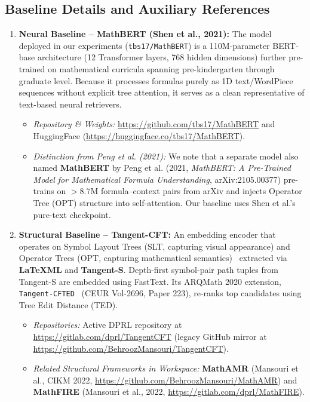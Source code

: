 \documentclass[11pt,a4paper]{article}
\begin{document}
	\subsection{Baseline Details and Auxiliary References}
	\begin{enumerate}
		\item \textbf{Neural Baseline -- MathBERT (Shen et al., 2021):} The model deployed in our experiments (\texttt{tbs17/MathBERT}) is a 110M-parameter BERT-base architecture (12 Transformer layers, 768 hidden dimensions) further pre-trained on mathematical curricula spanning pre-kindergarten through graduate level. Because it processes formulas purely as 1D text/WordPiece sequences without explicit tree attention, it serves as a clean representative of text-based neural retrievers.
		\begin{itemize}
			\item \textit{Repository \& Weights:} \url{https://github.com/tbs17/MathBERT} and HuggingFace (\url{https://huggingface.co/tbs17/MathBERT}).
			\item \textit{Distinction from Peng et al. (2021):} We note that a separate model also named \textbf{MathBERT} by Peng et al. (2021, \textit{MathBERT: A Pre-Trained Model for Mathematical Formula Understanding}, arXiv:2105.00377) pre-trains on $>8.7$M formula--context pairs from arXiv and injects Operator Tree (OPT) structure into self-attention. Our baseline uses Shen et al.'s pure-text checkpoint.
		\end{itemize}
		\item \textbf{Structural Baseline -- Tangent-CFT:} An embedding encoder that operates on Symbol Layout Trees (SLT, capturing visual appearance) and Operator Trees (OPT, capturing mathematical semantics)~\cite{mir_book2024} extracted via \textbf{LaTeXML} and \textbf{Tangent-S}. Depth-first symbol-pair path tuples from Tangent-S are embedded using FastText. Its ARQMath 2020 extension, \texttt{Tangent-CFTED}~\cite{tangentcfted2020} (CEUR Vol-2696, Paper 223), re-ranks top candidates using Tree Edit Distance (TED).
		\begin{itemize}
			\item \textit{Repositories:} Active DPRL repository at \url{https://gitlab.com/dprl/TangentCFT} (legacy GitHub mirror at \url{https://github.com/BehroozMansouri/TangentCFT}).
			\item \textit{Related Structural Frameworks in Workspace:} \textbf{MathAMR} (Mansouri et al., CIKM 2022, \url{https://github.com/BehroozMansouri/MathAMR}) and \textbf{MathFIRE} (Mansouri et al., 2022, \url{https://gitlab.com/dprl/MathFIRE}).

\end{itemize}
\end{enumerate}
\end{document}
